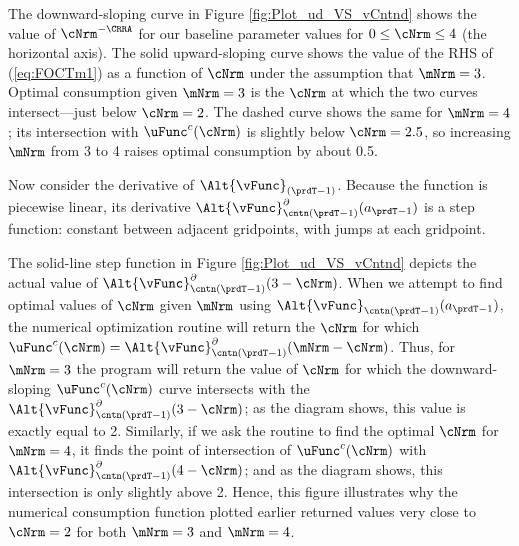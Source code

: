 \documentclass[SolvingMicroDSOPs]{subfiles}
\begin{document}
The downward-sloping curve in Figure \ref{fig:Plot_ud_VS_vCntnd}
shows the value of $\cNrm^{-\CRRA}$ for our baseline parameter values
for $0 \leq \cNrm \leq 4$ (the horizontal axis).  The solid
upward-sloping curve shows the value of the RHS of (\ref{eq:FOCTm1})
as a function of $\cNrm$ under the assumption that $\mNrm=3$.
Optimal consumption given $\mNrm=3$ is the $\cNrm$ at which the two curves intersect---just below $\cNrm=2$.
The dashed curve shows the same for $\mNrm=4$; its intersection with $\uFunc^{c}(\cNrm)$ is slightly below $\cNrm=2.5$, so increasing $\mNrm$ from 3 to 4 raises optimal consumption by about 0.5.

Now consider the derivative of $\Alt{\vFunc}_{(\prdT-1)}$.  Because the function is piecewise linear, its derivative $\Alt{\vFunc}_{{\cntn}(\prdT-1)}^{\partial}(a_{\prdT-1})$ is a step function: constant between adjacent gridpoints, with jumps at each gridpoint.

The solid-line step function in Figure \ref{fig:Plot_ud_VS_vCntnd} depicts the actual value of
$\Alt{\vFunc}_{{\cntn}(\prdT-1)}^{\partial}(3-\cNrm)$.  When we attempt to find optimal values of
$\cNrm$ given $\mNrm$ using $\Alt{\vFunc}_{{\cntn}(\prdT-1)}(a_{\prdT-1})$, the numerical optimization routine will
return the $\cNrm$ for which
$\uFunc^{c}(\cNrm) = \Alt{\vFunc}^{\partial}_{{\cntn}(\prdT-1)}(\mNrm-\cNrm)$.  Thus, for
$\mNrm=3$ the program will return the value of $\cNrm$ for which the downward-sloping
$\uFunc^{c}(\cNrm)$ curve intersects with the
$\Alt{\vFunc}_{{\cntn}(\prdT-1)}^{\partial}(3-\cNrm)$; as the diagram shows, this value is exactly equal to 2.
Similarly, if we ask the routine to find the optimal $\cNrm$ for $\mNrm=4$, it finds the point of
intersection of $\uFunc^{c}(\cNrm)$ with $\Alt{\vFunc}_{{\cntn}(\prdT-1)}^{\partial}(4-\cNrm)$; and as the diagram shows, this
intersection is only slightly above 2.  Hence, this figure illustrates why the numerical consumption
function plotted earlier returned values very close to $\cNrm=2$ for both $\mNrm=3$ and $\mNrm=4$.
\end{document}
